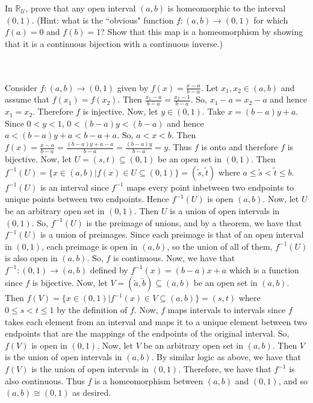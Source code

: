 In $\mathbb{R}_{\mathcal{U}}$, prove that any open interval $(a,b)$ is homeomorphic to the interval
$(0,1)$. (Hint: what is the ``obvious" function $f:(a,b)\to(0,1)$ for which $f(a) = 0$ and $f(b) = 1$?
Show that this map is a homeomorphism by showing that it is a continuous bijection with a continuous
inverse.)\\\\

\begin{solution}\renewcommand{\qedsymbol}{}\ \\
    Consider $f:(a,b)\to(0,1)$ given by $f(x)=\frac{x-a}{b-a}$. Let $x_1,x_2\in(a,b)$ and assume that
    $f(x_1)=f(x_2)$. Then $\frac{x_1-a}{b-a}=\frac{x_2-1}{b-a}$. So, $x_1-a=x_2-a$ and hence $x_1=x_2$.
    Therefore $f$ is injective. Now, let $y\in(0,1)$. Take $x=(b-a)y+a$. Since $0<y<1$, $0<(b-a)y<(b-a)$
    and hence $a<(b-a)y+a<b-a+a$. So, $a<x<b$. Then
    $f(x)=\frac{x-a}{b-a}=\frac{(b-a)y+a-a}{b-a}=\frac{(b-a)y}{b-a}=y$. Thus $f$ is onto and therefore
    $f$ is bijective. Now, let $U=(s,t)\subseteq(0,1)$ be an open set in $(0,1)$. Then
    $f^{-1}(U)=\{x\in(a,b)|f(x)\in U\subseteq(0,1)\}=(\tilde{s},\tilde{t})$ where
    $a\leq\tilde{s}<\tilde{t}\leq b$. $f^{-1}(U)$ is an interval since $f^{-1}$ maps every point
    inbetween two endpoints to unique points between two endpoints. Hence $f^{-1}(U)$ is open $(a,b)$.
    Now, let $U$ be an arbitrary open set in $(0,1)$. Then $U$ is a union of open intervals in $(0,1)$.
    So, $f^{-1}(U)$ is the preimage of unions, and by a theorem, we have that $f^{-1}(U)$ is a union of
    preimages. Since each preimage is that of an open interval in $(0,1)$, each preimage is open in
    $(a,b)$, so the union of all of them, $f^{-1}(U)$ is also open in $(a,b)$. So, $f$ is continuous.
    Now, we have that $f^{-1}:(0,1)\rightarrow(a,b)$ defined by $f^{-1}(x)=(b-a)x+a$ which is a function
    since $f$ is bijective. Now, let $V=(\tilde{a},\tilde{b})\subseteq(a,b)$ be an open set in $(a,b)$.
    Then $f(V)=\{x\in(0,1)|f^{-1}(x)\in V\subseteq(a,b)\}=(s,t)$ where $0\leq s<t\leq1$ by the
    definition of $f$. Now, $f$ maps intervals to intervals since $f$ takes each element from an
    interval and maps it to a unique element between two endpoints that are the mappings of the
    endpoints of the original interval. So, $f(V)$ is open in $(0,1)$. Now, let $V$ be an arbitrary open
    set in $(a,b)$. Then $V$ is the union of open intervals in $(a,b)$. By similar logic as above, we
    have that $f(V)$ is the union of open intervals in $(0,1)$. Therefore, we have that $f^{-1}$ is also
    continuous. Thus $f$ is a homeomorphism between $(a,b)$ and $(0,1)$, and so $(a,b)\cong(0,1)$ as
    desired.

\end{solution}